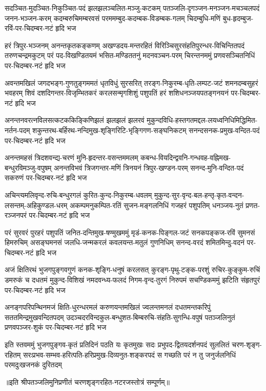 \setlength{\shlokaspaceskip}{4pt}
\fourlineindentedshloka
{सदञ्चित-मुदञ्चित-निकुञ्चित-पदं झलझलञ्चलित-मञ्जु-कटकम्}
{पतञ्जलि-दृगञ्जन-मनञ्जन-मचञ्चलपदं जनन-भञ्जन-करम्}
{कदम्बरुचिमम्बरवसं परममम्बुद-कदम्बक-विडम्बक-गलम्}
{चिदम्बुधि-मणिं बुध-हृदम्बुज-रविं-पर-चिदम्बर-नटं हृदि भज} %

\fourlineindentedshloka
{हरं त्रिपुर-भञ्जनम् अनन्तकृतकङ्कणम् अखण्डदय-मन्तरहितं}
{विरिञ्चिसुरसंहतिपुरन्धर-विचिन्तितपदं तरुणचन्द्रमकुटम्}
{परं पद-विखण्डितयमं भसित-मण्डिततनुं मदनवञ्चन-परम्}
{चिरन्तनममुं प्रणवसञ्चितनिधिं पर-चिदम्बर-नटं हृदि भज} %

\fourlineindentedshloka
{अवन्तमखिलं जगदभङ्ग-गुणतुङ्गममतं धृतविधुं सुरसरित्}
{तरङ्ग-निकुरम्ब-धृति-लम्पट-जटं शमनदम्बसुहरं भवहरम्}
{शिवं दशदिगन्तर-विजृम्भितकरं करलसन्मृगशिशुं पशुपतिं}
{हरं शशिधनञ्जयपतङ्गनयनं पर-चिदम्बर-नटं हृदि भज} %

\fourlineindentedshloka
{अनन्तनवरत्नविलसत्कटककिङ्किणिझलं झलझलं झलरवं}
{मुकुन्दविधि-हस्तगतमद्दल-लयध्वनिधिमिद्धिमित-नर्तन-पदम्}
{शकुन्तरथ-बर्हिरथ-नन्दिमुख-शृङ्गिरिटि-भृङ्गिगण-सङ्घनिकटम्}
{सनन्दसनक-प्रमुख-वन्दित-पदं पर-चिदम्बर-नटं हृदि भज} %

\fourlineindentedshloka
{अनन्तमहसं त्रिदशवन्द्य-चरणं मुनि-हृदन्तर-वसन्तममलम्}
{कबन्ध-वियदिन्द्ववनि-गन्धवह-वह्निमख-बन्धुरविमञ्जु-वपुषम्}
{अनन्तविभवं त्रिजगन्तर-मणिं त्रिनयनं त्रिपुर-खण्डन-परम्}
{सनन्द-मुनि-वन्दित-पदं सकरुणं पर-चिदम्बर-नटं हृदि भज} %

\fourlineindentedshloka
{अचिन्त्यमलिवृन्द-रुचि-बन्धुरगलं कुरित-कुन्द-निकुरम्ब-धवलम्}
{मुकुन्द-सुर-वृन्द-बल-हन्तृ-कृत-वन्दन-लसन्तम्-अहिकुण्डल-धरम्}
{अकम्पमनुकम्पित-रतिं सुजन-मङ्गलनिधिं गजहरं पशुपतिम्}
{धनञ्जय-नुतं प्रणत-रञ्जनपरं पर-चिदम्बर-नटं हृदि भज} %

\fourlineindentedshloka
{परं सुरवरं पुरहरं पशुपतिं जनित-दन्तिमुख-षण्मुखममुं}
{मृडं-कनक-पिङ्गल-जटं सनकपङ्कज-रविं सुमनसं हिमरुचिम्}
{असङ्घमनसं जलधि-जन्मकरलं कवलयन्त-मतुलं गुणनिधिम्}
{सनन्द-वरदं शमितमिन्दु-वदनं पर-चिदम्बर-नटं हृदि भज} %

\fourlineindentedshloka
{अजं क्षितिरथं भुजगपुङ्गवगुणं कनक-शृङ्गि-धनुषं करलसत्}
{कुरङ्ग-पृथु-टङ्क-परशुं रुचिर-कुङ्कुम-रुचिं डमरुकं च दधतमं}
{मुकुन्द-विशिखं नमदवन्ध्य-फलदं निगम-वृन्द-तुरगं निरुपमं}
{सचण्डिकममुं झटिति संहृतपुरं पर-चिदम्बर-नटं हृदि भज} %

\fourlineindentedshloka
{अनङ्गपरिपन्थिनमजं क्षिति-धुरन्धरमलं करुणयन्तमखिलं}
{ज्वलन्तमनलं दधतमन्तकरिपुं सततमिन्द्रमुखवन्दितपदम्}
{उदञ्चदरविन्दकुल-बन्धुशत-बिम्बरुचि-संहति-सुगन्धि-वपुषं}
{पतञ्जलिनुतं प्रणवपञ्जर-शुकं पर-चिदम्बर-नटं हृदि भज} %

\fourlineindentedshloka
{इति स्तवममुं भुजगपुङ्गव-कृतं प्रतिदिनं पठति यः कृतमुखः}
{सदः प्रभुपद-द्वितयदर्शनपदं सुललितं चरण-शृङ्ग-रहितम्}
{सरःप्रभव-सम्भव-हरित्पति-हरिप्रमुख-दिव्यनुत-शङ्करपदं}
{स गच्छति परं न तु जनुर्जलनिधिं परमदुःखजनकं दुरितदम्} %

॥इति श्रीपतञ्जलिमुनिप्रणीतं चरणशृङ्गरहित-नटरजस्तोत्रं सम्पूर्णम्॥
\setlength{\shlokaspaceskip}{24pt}